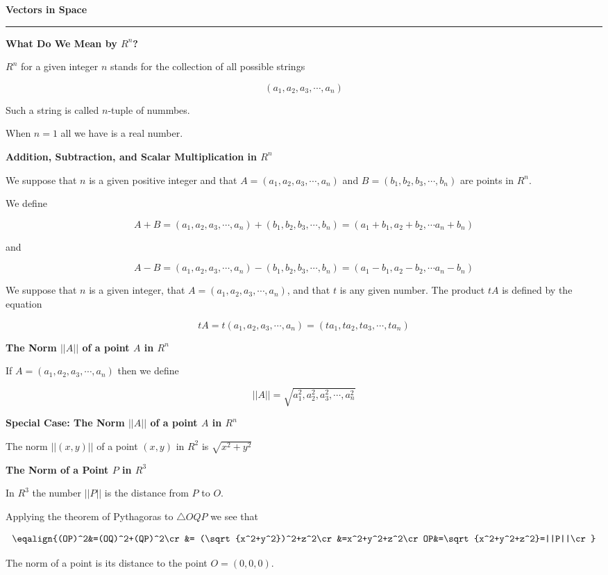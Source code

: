 {\bf Vectors in Space}
\vskip 1mm
\hrule

\vskip 6pt
{\bf What Do We Mean by $R^n$?}

\vskip 6pt
$R^n$ for a given integer $n$ stands for the collection of all possible strings

$$(a_1,a_2,a_3,\cdots,a_n)$$

Such a string is called $n$-tuple of nummbes.

\vskip 1mm
When $n=1$ all we have is a real number.

\filbreak
\vskip 1cm
{\bf Addition, Subtraction, and Scalar Multiplication in $R^n$}

\vskip 6pt
We suppose that $n$ is a given positive integer and that $A=(a_1,a_2,a_3,\cdots,a_n)$ and $B=(b_1,b_2,b_3,\cdots,b_n)$ are points in $R^n$.

\vskip 1mm
We define

$$A+B=(a_1,a_2,a_3,\cdots,a_n)+(b_1,b_2,b_3,\cdots,b_n)=(a_1+b_1,a_2+b_2,\cdots a_n+b_n)$$

and

$$A-B=(a_1,a_2,a_3,\cdots,a_n)-(b_1,b_2,b_3,\cdots,b_n)=(a_1-b_1,a_2-b_2,\cdots a_n-b_n)$$

We suppose that $n$ is a given integer, that $A=(a_1,a_2,a_3,\cdots,a_n)$, and that $t$ is any given number. The product $tA$ is defined by the equation

$$tA=t(a_1,a_2,a_3,\cdots,a_n)=(ta_1,ta_2,ta_3,\cdots,ta_n)$$

\filbreak
\vskip 1cm
{\bf The Norm $||A||$ of a point $A$ in $R^n$}

If $A=(a_1,a_2,a_3,\cdots,a_n)$ then we define

$$||A||=\sqrt{a{}_1^2,a{}_2^2,a{}_3^2,\cdots,a{}_n^2}$$

\filbreak
\vskip 1cm
{\bf Special Case: The Norm $||A||$ of a point $A$ in $R^n$}

\vskip 1mm
The norm $||(x,y)||$ of a point $(x,y)$ in $R^2$ is $\sqrt{x^2+y^2}$

\filbreak
\vskip 1cm
{\bf The Norm of a Point $P$ in $R^3$}

\vskip 1mm
In $R^3$ the number $||P||$ is the distance from $P$ to $O$.

\vskip 1mm
Applying the theorem of Pythagoras to $\triangle OQP$ we see that

$$\eqalign{(OP)^2&=(OQ)^2+(QP)^2\cr
		&= (\sqrt{x^2+y^2})^2+z^2\cr
		&=x^2+y^2+z^2\cr
		OP&=\sqrt{x^2+y^2+z^2}=||P||\cr}$$

The norm of a point is its distance to the point $O=(0,0,0)$.

